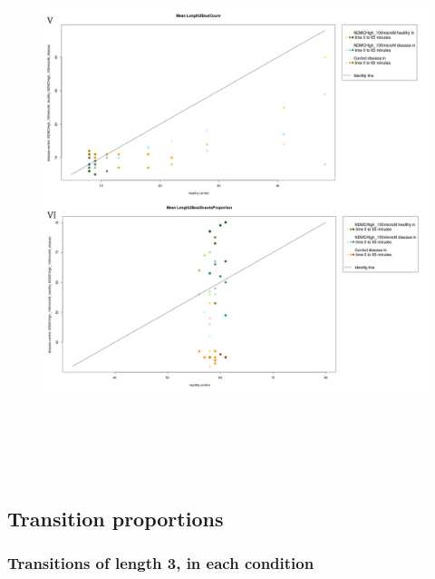 \begin{figure}[h!]
\begin{center}
\includegraphics[width=15cm,height=16cm]{PTZCountScootsN.png}
\end{center}
\end{figure}


\newpage
\subsection{Transition proportions}
\subsubsection{Transitions of length 3, in each condition}

